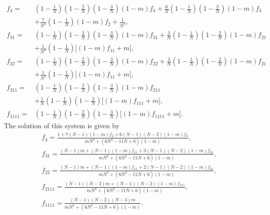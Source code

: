 \documentclass[11pt]{article}
\begin{document}
\begin{subequations}
\begin{align}
f_{4}=&\left(1-\frac{1}{N}\right)\left(1-\frac{2}{N}\right)\left(1-\frac{3}{N}\right)(1-m)f_{4}
+\frac{6}{N}\left(1-\frac{1}{N}\right)\left(1-\frac{2}{N}\right)(1-m)f_{3}
\nonumber\\
&+\frac{7}{N^2}\left(1-\frac{1}{N}\right)(1-m)f_{2}
+\frac{1}{N^3},\\
f_{31}=&\left(1-\frac{1}{N}\right)\left(1-\frac{2}{N}\right)\left(1-\frac{3}{N}\right)(1-m)f_{31}
+\frac{3}{N}\left(1-\frac{1}{N}\right)\left(1-\frac{2}{N}\right)(1-m)f_{21}
\nonumber\\
&+\frac{1}{N^2}\left(1-\frac{1}{N}\right)\Big[(1-m)f_{11}
+m\Big],\\
f_{22}=&\left(1-\frac{1}{N}\right)\left(1-\frac{2}{N}\right)\left(1-\frac{3}{N}\right)(1-m)f_{22}
+\frac{2}{N}\left(1-\frac{1}{N}\right)\left(1-\frac{2}{N}\right)(1-m)f_{21}
\nonumber\\
&+\frac{1}{N^2}\left(1-\frac{1}{N}\right)\Big[(1-m)f_{11}+m\Big],\\
f_{211}=&\left(1-\frac{1}{N}\right)\left(1-\frac{2}{N}\right)\left(1-\frac{3}{N}\right)(1-m)f_{211}\nonumber\\
&+\frac{1}{N}\left(1-\frac{1}{N}\right)\left(1-\frac{2}{N}\right)\Big[(1-m)f_{111}+m\Big],\\
f_{1111}=&\left(1-\frac{1}{N}\right)\left(1-\frac{2}{N}\right)\left(1-\frac{3}{N}\right)\Big[(1-m)f_{1111}
+m\Big].
\end{align}
\end{subequations}
The solution of this system is given by
\begin{subequations}
\begin{align}
&f_{4}=\frac{1+7(N-1)(1-m)f_{2}+6(N-1)(N-2)(1-m)f_{3}}{mN^3+(6N^2-11N+6)(1-m)},\\
&f_{31}=\frac{(N-1)m+(N-1)(1-m)f_{11}+3(N-1)(N-2)(1-m)f_{21}}{mN^3+(6N^2-11N+6)(1-m)},\\
&f_{22}=\frac{(N-1)m+(N-1)(1-m)f_{11}+2(N-1)(N-2)(1-m)f_{21}}{mN^3+(6N^2-11N+6)(1-m)},\\
&f_{2111}=\frac{(N-1)(N-2)m+(N-1)(N-2)(1-m)f_{111}}{mN^3+(6N^2-11N+6)(1-m)},\\
&f_{1111}=\frac{(N-1)(N-2)(N-3)m}{mN^3+(6N^2-11N+6)(1-m)}. 
\end{align}
\end{subequations}



\end{document}
